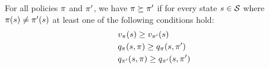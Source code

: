 \begin{lemma}
\label{thm: general PIT}
    For all policies $\pi$ and $\pi'$,
    we have $\pi \succeq \pi'$
    if for every state $s \in \mathcal{S}$ where $\pi(s) \neq \pi'(s)$ 
    at least one of the following conditions hold:
    \vspace{-0.3cm}
    \begin{subequations}
        \begin{align}
            &v_{\pi}(s) \geq v_{\pi'}(s)
            \\
            &q_{\pi}(s, \pi) \geq q_{\pi}(s, \pi')
            \\
            &q_{\pi'}(s, \pi) \geq q_{\pi'}(s, \pi')
        \end{align}
    \end{subequations}


\end{lemma}
\vspace{-0.7cm}

